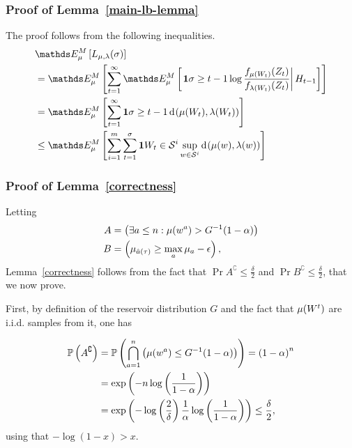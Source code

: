 \subsubsection{Proof of Lemma~\ref{main-lb-lemma}}

The proof follows from the following inequalities.
\begin{align*}
& \ETrueModel{ L_{\ArmMean,\ArmMeanAlt}(\sigma) } \\
&= \ETrueModel{ \sum_{t=1}^\infty
	\ETrueModel{ \left.\1{\sigma \geq t-1} \log
	\frac{f_{\ArmMean(\armRV_t)}(\rewardRV_t)}{f_{\ArmMeanAlt(\armRV_t)}(\rewardRV_t)} \right|
	\historyRV_{t-1}}}\\
& = \ETrueModel{ \sum_{t=1}^\infty \1{\sigma \geq t-1}
\ArmKL{\ArmMean(\armRV_t)}{\ArmMeanAlt(\armRV_t)}} \\
& \leq  \ETrueModel{ \sum_{i=1}^m \sum_{t=1}^\sigma \1{\armRV_t \in \ArmGrp{i}}
\sup_{\arm \in \ArmGrp{i}} \ArmKL{\ArmMean(\arm)}{\ArmMeanAlt(\arm)} }
\end{align*}


\subsubsection{Proof of Lemma~\ref{correctness}}\label{proof:correctness}

Letting
\begin{align*}
A & =  \left(\exists a \leq n : \mu(w^a) > G^{-1}(1-\alpha)\right) \\
B & =  \left(\mu_{\hat{a}(\tau)} \geq \max_{a} \mu_a - \epsilon\right),
\end{align*}
Lemma~\ref{correctness} follows from the fact that $\Pr{A^\complement}\leq \frac{\delta}{2}$ and $\Pr{B^\complement} \leq \frac{\delta}{2}$, that we now prove. 

First, by definition of the reservoir distribution $G$ and the fact that $\mu(W^t)$ are i.i.d. samples from it, one has

\begin{align*}
 \mathbb{P}\left( A^\complement \right) & =  \mathbb{P}\left( \bigcap_{a = 1}^n\left( \mu(w^a) \leq G^{-1}(1-\alpha)\right) \right)
 	= \left(1 - \alpha \right)^n \\
 & =  \exp\left(-n\log\left(\frac{1}{1- \alpha}\right)\right) \\
 & =  \exp\left(-\log\left(\frac{2}{\delta}\right)\frac{1}{\alpha}\log\left(\frac{1}{1- \alpha}\right)\right) \leq \frac{\delta}{2},
\end{align*}
using that $-\log(1-x)>x$. 

